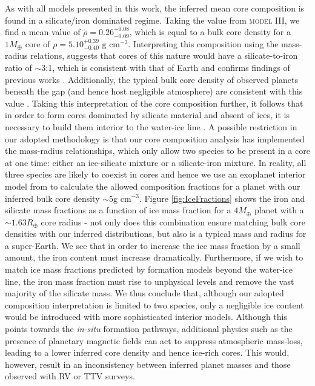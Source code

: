 \documentclass[fleqn,usenatbib]{mnras}
\begin{document}
As with all models presented in this work, the inferred mean core composition is found in a silicate/iron dominated regime. Taking the value from \textsc{model III}, we find a mean value of $\tilde{\rho} = 0.26^{+0.08}_{-0.09}$, which is equal to a bulk core density for a $1M_\oplus$ core of $\rho = 5.10^{+0.39}_{-0.40} \text{ g cm}^{-3}$. Interpreting this composition using the \cite{Fortney2007} mass-radius relations, suggests that cores of this nature would have a silicate-to-iron ratio of $\sim$3:1, which is consistent with that of Earth and confirms findings of previous works \citep[e.g.][]{Owen2017,Wu2019}. Additionally, the typical bulk core density of observed planets beneath the gap (and hence host negligible atmosphere) are consistent with this value \citep{Dressing2015,Dorn2019}. Taking this interpretation of the core composition further, it follows that in order to form cores dominated by silicate material and absent of ices, it is necessary to build them interior to the water-ice line \citep{Chatterjee2014,Jankovic2018}. A possible restriction in our adopted methodology is that our core composition analysis has implemented the \cite{Fortney2007} mass-radius relationships, which only allow two species to be present in a core at one time: either an ice-silicate mixture or a silicate-iron mixture. In reality, all three species are likely to coexist in cores and hence we use an exoplanet interior model from \cite{Zeng2008} to calculate the allowed composition fractions for a planet with our inferred bulk core density $\sim 5\text{g cm}^{-3}$. Figure \ref{fig:IceFractions} shows the iron and silicate mass fractions as a function of ice mass fraction for a $4M_\oplus$ planet with a $\sim 1.63R_\oplus$ core radius - not only does this combination ensure matching bulk core densities with our inferred distributions, but also is a typical mass and radius for a super-Earth. We see that in order to increase the ice mass fraction by a small amount, the iron content must increase dramatically. Furthermore, if we wish to match ice mass fractions predicted by formation models beyond the water-ice line, the iron mass fraction must rise to unphysical levels and remove the vast majority of the silicate mass. We thus conclude that, although our adopted composition interpretation is limited to two species, only a negligible ice content would be introduced with more sophisticated interior models.  Although this points towards the \textit{in-situ} formation pathways, additional physics such as the presence of planetary magnetic fields \citep{OwenAdams2019} can act to suppress atmospheric mass-loss, leading to a lower inferred core density and hence ice-rich cores. This would, however, result in an inconsistency between inferred planet masses and those observed with RV or TTV surveys. 
\end{document}
